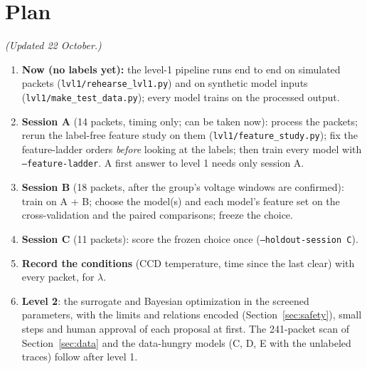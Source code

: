 \documentclass[10pt]{article}
\newcommand{\code}[1]{\texttt{#1}}
\begin{document}
\section{Plan}

\textit{(Updated 22 October.)}
\begin{enumerate}
\item \textbf{Now (no labels yet):} the level-1 pipeline runs end to end on simulated packets (\code{lvl1/rehearse\_lvl1.py}) and on
  synthetic model inputs (\code{lvl1/make\_test\_data.py}); every model trains on the processed output.
\item \textbf{Session A} (14 packets, timing only; can be taken now): process the packets; rerun the label-free feature study on them
  (\code{lvl1/feature\_study.py}); fix the feature-ladder orders \emph{before} looking at the labels; then train every model with
  \code{--feature-ladder}. A first answer to level 1 needs only session A.
\item \textbf{Session B} (18 packets, after the group's voltage windows are confirmed): train on A + B; choose the model(s) and each model's
  feature set on the cross-validation and the paired comparisons; freeze the choice.
\item \textbf{Session C} (11 packets): score the frozen choice once (\code{--holdout-session C}).
\item \textbf{Record the conditions} (CCD temperature, time since the last clear) with every packet, for $\lambda$.
\item \textbf{Level 2}: the surrogate and Bayesian optimization in the screened parameters, with the limits and relations encoded
  (Section~\ref{sec:safety}), small steps and human approval of each proposal at first. The 241-packet scan of Section~\ref{sec:data}
  and the data-hungry models (C, D, E with the unlabeled traces) follow after level 1.
\end{enumerate}
\end{document}

